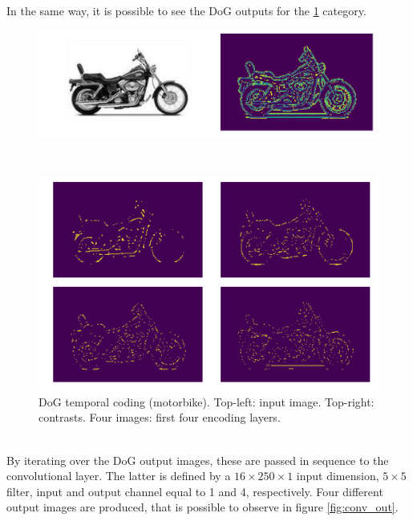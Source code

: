 \documentclass[11pt,a4paper]{scrartcl}
\begin{document}
In the same way, it is possible to see the DoG outputs for the \ref{fig:motor} category.\\
\begin{figure}[!h]
	\centering
	\begin{minipage}[b]{0.685\textwidth}
		\includegraphics[width=\textwidth]{images/motor_temp}
	\end{minipage}
	\\
	\begin{minipage}[b]{0.685\textwidth}
		\includegraphics[width=\textwidth]{images/motor_dog_out}
	\end{minipage}
	\caption{DoG temporal coding (motorbike). Top-left: input image. Top-right: contrasts. Four images: first four encoding layers.}
	\label{fig:motor}
\end{figure}\\
By iterating over the DoG output images, these are passed in sequence to the convolutional layer. The latter is defined by a $ 16\times250\times1 $ input dimension, $ 5\times5 $ filter,  input and output channel equal to 1 and 4, respectively.
Four different output images are produced, that is possible to observe in figure \ref{fig:conv_out}. 
\end{document}
